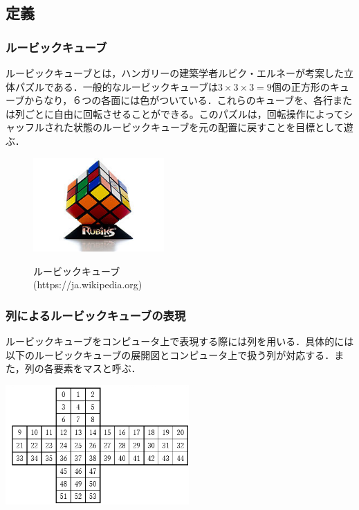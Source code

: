 \documentclass[titlepage]{jarticle}
\begin{document}
\subsection{定義}
\subsubsection{ルービックキューブ}
ルービックキューブとは，ハンガリーの建築学者ルビク・エルネーが考案した立体パズルである．一般的なルービックキューブは\(3\times 3\times 3=9\)個の正方形のキューブからなり，６つの各面には色がついている．これらのキューブを、各行または列ごとに自由に回転させることができる。このパズルは，回転操作によってシャッフルされた状態のルービックキューブを元の配置に戻すことを目標として遊ぶ．\\

\begin{figure}
  \centering
  \includegraphics[width=5cm]{./tex_pic/rubik-cube.jpg}\\
  \caption{ルービックキューブ\\(https://ja.wikipedia.org)}
\end{figure}

\subsubsection{列によるルービックキューブの表現}
ルービックキューブをコンピュータ上で表現する際には列を用いる．具体的には以下のルービックキューブの展開図とコンピュータ上で扱う列が対応する．また，列の各要素をマスと呼ぶ．\\
\begin{center}
  \includegraphics[width=7cm]{./tex_pic/seq.jpg}\\
\end{center}
\end{document}
